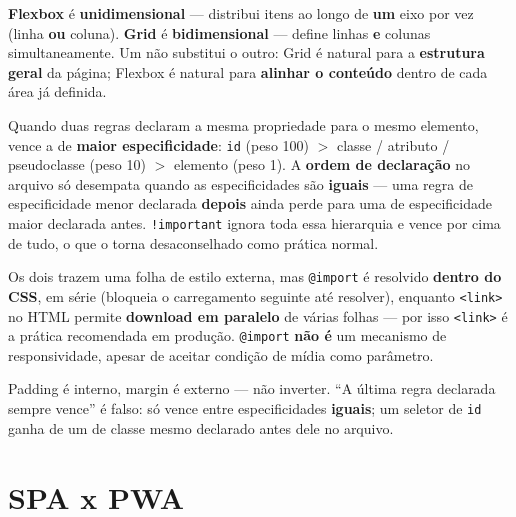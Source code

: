 \begin{conceito}
\textbf{Flexbox} é \textbf{unidimensional} --- distribui itens ao longo
de \textbf{um} eixo por vez (linha \textbf{ou} coluna). \textbf{Grid} é
\textbf{bidimensional} --- define linhas \textbf{e} colunas
simultaneamente. Um não substitui o outro: Grid é natural para a
\textbf{estrutura geral} da página; Flexbox é natural para
\textbf{alinhar o conteúdo} dentro de cada área já definida.
\end{conceito}

\begin{conceito}
Quando duas regras declaram a mesma propriedade para o mesmo elemento,
vence a de \textbf{maior especificidade}: \texttt{id} (peso 100) $>$
classe / atributo / pseudoclasse (peso 10) $>$ elemento (peso 1). A
\textbf{ordem de declaração} no arquivo só desempata quando as
especificidades são \textbf{iguais} --- uma regra de especificidade menor
declarada \textbf{depois} ainda perde para uma de especificidade maior
declarada antes. \texttt{!important} ignora toda essa hierarquia e vence
por cima de tudo, o que o torna desaconselhado como prática normal.
\end{conceito}

\begin{conceito}
Os dois trazem uma folha de estilo externa, mas \texttt{@import} é
resolvido \textbf{dentro do CSS}, em série (bloqueia o carregamento
seguinte até resolver), enquanto \texttt{<link>} no HTML permite
\textbf{download em paralelo} de várias folhas --- por isso
\texttt{<link>} é a prática recomendada em produção. \texttt{@import}
\textbf{não é} um mecanismo de responsividade, apesar de aceitar
condição de mídia como parâmetro.
\end{conceito}

\begin{cuidado}
Padding é interno, margin é externo --- não inverter. “A última regra
declarada sempre vence” é falso: só vence entre especificidades
\textbf{iguais}; um seletor de \texttt{id} ganha de um de classe mesmo
declarado antes dele no arquivo.
\end{cuidado}

\section{SPA x PWA}

